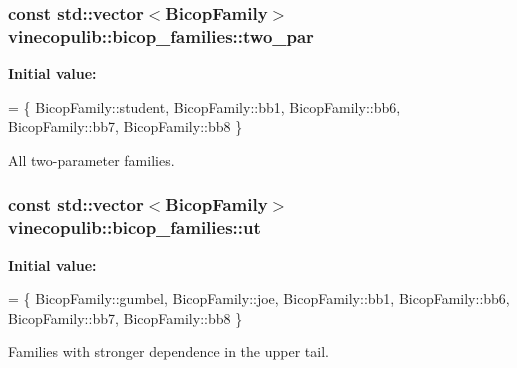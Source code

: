 \subsubsection[{\texorpdfstring{two\+\_\+par}{two_par}}]{\setlength{\rightskip}{0pt plus 5cm}const std\+::vector$<${\bf Bicop\+Family}$>$ vinecopulib\+::bicop\+\_\+families\+::two\+\_\+par}\hypertarget{namespacevinecopulib_1_1bicop__families_ad5871c39b4ee62bd44fa851d7d70c7ca}{}\label{namespacevinecopulib_1_1bicop__families_ad5871c39b4ee62bd44fa851d7d70c7ca}
{\bfseries Initial value\+:}
\begin{DoxyCode}
= \{
            BicopFamily::student,
            BicopFamily::bb1, 
            BicopFamily::bb6, 
            BicopFamily::bb7, 
            BicopFamily::bb8
        \}
\end{DoxyCode}


All two-\/parameter families. 

\subsubsection[{\texorpdfstring{ut}{ut}}]{\setlength{\rightskip}{0pt plus 5cm}const std\+::vector$<${\bf Bicop\+Family}$>$ vinecopulib\+::bicop\+\_\+families\+::ut}\hypertarget{namespacevinecopulib_1_1bicop__families_af754a2d2697709c204dda0473215f9cd}{}\label{namespacevinecopulib_1_1bicop__families_af754a2d2697709c204dda0473215f9cd}
{\bfseries Initial value\+:}
\begin{DoxyCode}
= \{
            BicopFamily::gumbel, 
            BicopFamily::joe, 
            BicopFamily::bb1, 
            BicopFamily::bb6, 
            BicopFamily::bb7, 
            BicopFamily::bb8
        \}
\end{DoxyCode}


Families with stronger dependence in the upper tail. 

